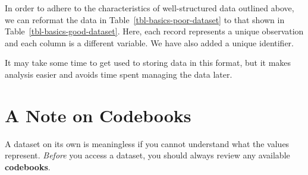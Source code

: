 \documentclass[
  letterpaper,
  DIV=11,
  numbers=noendperiod]{scrreprt}
\theoremstyle{definition}
\theoremstyle{definition}
\theoremstyle{plain}
\theoremstyle{remark}
\begin{document}
In order to adhere to the characteristics of well-structured data
outlined above, we can reformat the data in
Table~\ref{tbl-basics-poor-dataset} to that shown in
Table~\ref{tbl-basics-good-dataset}. Here, each record represents a
unique observation and each column is a different variable. We have also
added a unique identifier.

\begin{table}

\caption{\label{tbl-basics-good-dataset}Example of a well-structured
dataset. The data is from a hypothetical study comparing battery
lifetimes (hours).}


\end{table}%

It may take some time to get used to storing data in this format, but it
makes analysis easier and avoids time spent managing the data later.

\section{A Note on Codebooks}\label{a-note-on-codebooks}

A dataset on its own is meaningless if you cannot understand what the
values represent. \emph{Before} you access a dataset, you should always
review any available \textbf{codebooks}.
\end{document}
